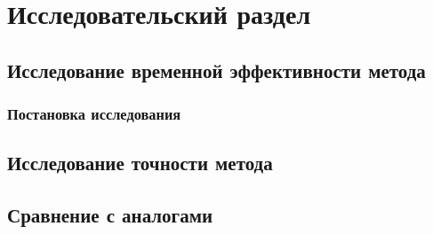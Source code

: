 \chapter{Исследовательский раздел}

\section{Исследование временной эффективности метода}

\subsection{Постановка исследования}

\section{Исследование точности метода}

\section{Сравнение с аналогами}
